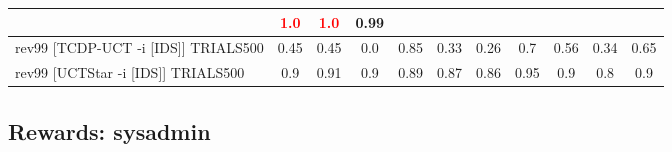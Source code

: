 \documentclass{article}
\begin{document}
\begin{tabular}{|l|r@{$\pm$}rr@{$\pm$}rr@{$\pm$}rr@{$\pm$}rr@{$\pm$}rr@{$\pm$}rr@{$\pm$}rr@{$\pm$}rr@{$\pm$}rr@{$\pm$}r|}
& \multicolumn{2}{c}{\textbf{\textcolor{red}{1.0}}}
& \multicolumn{2}{c}{\textbf{\textcolor{red}{1.0}}}
& \multicolumn{2}{c|}{0.99}
\\
\hline
rev99 [TCDP-UCT -i [IDS]] TRIALS500
& \multicolumn{2}{c}{0.45}
& \multicolumn{2}{c}{0.45}
& \multicolumn{2}{c}{0.0}
& \multicolumn{2}{c}{0.85}
& \multicolumn{2}{c}{0.33}
& \multicolumn{2}{c}{0.26}
& \multicolumn{2}{c}{0.7}
& \multicolumn{2}{c}{0.56}
& \multicolumn{2}{c}{0.34}
& \multicolumn{2}{c|}{0.65}
\\
rev99 [UCTStar -i [IDS]] TRIALS500
& \multicolumn{2}{c}{0.9}
& \multicolumn{2}{c}{0.91}
& \multicolumn{2}{c}{0.9}
& \multicolumn{2}{c}{0.89}
& \multicolumn{2}{c}{0.87}
& \multicolumn{2}{c}{0.86}
& \multicolumn{2}{c}{0.95}
& \multicolumn{2}{c}{0.9}
& \multicolumn{2}{c}{0.8}
& \multicolumn{2}{c|}{0.9}
\\
\hline
\end{tabular}%

\bigskip

\subsection*{Rewards: sysadmin}
\end{document}
